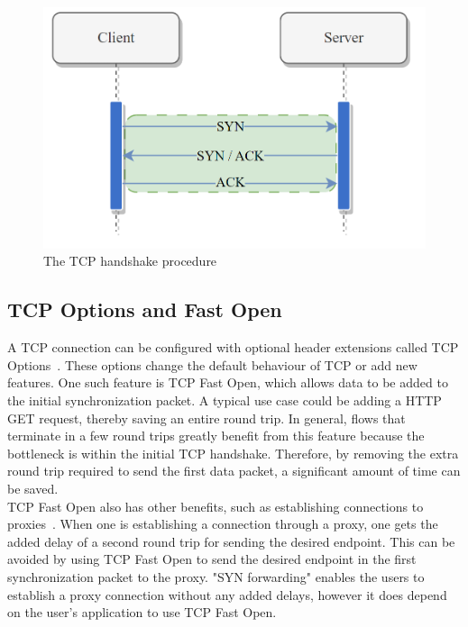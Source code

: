 \documentclass[a4paper,english, 11pt]{report}
\begin{document}
\begin{figure} %
	\centering
	\includegraphics[scale=0.75]{../diagrams/drawio/tcphandshake.png}
  	\caption{The TCP handshake procedure}
  	\label{fig:tcphandshake}
\end{figure}

\subsection{TCP Options and Fast Open}
A TCP connection can be configured with optional header extensions called TCP Options~\cite{tcp_options}. These options change the default behaviour of TCP or add new features. One such feature is TCP Fast Open, which allows data to be added to the initial synchronization packet. A typical use case could be adding a HTTP GET request, thereby saving an entire round trip. In general, flows that terminate in a few round trips greatly benefit from this feature because the bottleneck is within the initial TCP handshake. Therefore, by removing the extra round trip required to send the first data packet, a significant amount of time can be saved.\\

TCP Fast Open also has other benefits, such as establishing connections to proxies~\cite{rfc8803}. When one is establishing a connection through a proxy, one gets the added delay of a second round trip for sending the desired endpoint. This can be avoided by using TCP Fast Open to send the desired endpoint in the first synchronization packet to the proxy. "SYN forwarding" enables the users to establish a proxy connection without any added delays, however it does depend on the user's application to use TCP Fast Open.
\end{document}
